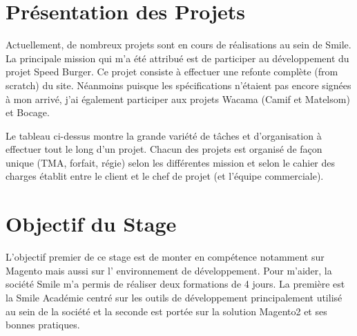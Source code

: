 \documentclass[12pt, a4paper, twoside]{report}
\begin{document}
\section{Présentation des Projets}

 Actuellement, de nombreux projets sont en cours de réalisations au sein de Smile. La principale mission qui m'a été attribué est de participer au développement du projet Speed Burger. Ce projet consiste à effectuer une refonte complète (from scratch) du site. Néanmoins puisque les spécifications n'étaient pas encore signées à mon arrivé, j'ai également participer aux projets Wacama (Camif et Matelsom) et Bocage. \\
 
 \begin{table}[H]
 	\centering
 \caption{ Tableau récapitulatif des objectifs principaux pour chaque projet auxquelles j'ai participé.}
 \end{table}

Le tableau ci-dessus montre la grande variété de tâches et d'organisation à effectuer tout le long d'un projet. Chacun des projets est organisé de façon unique (TMA, forfait, régie) selon les différentes mission et selon le cahier des charges établit entre le client et le chef de projet (et l'équipe commerciale). 


\section{Objectif du Stage}

L'objectif premier de ce stage est de monter en compétence notamment sur Magento mais aussi sur l' environnement de développement. Pour m'aider, la société Smile m'a permis de réaliser deux formations de 4 jours. La première est la Smile Académie centré sur les outils de développement principalement utilisé au sein de la société et la seconde est portée sur la solution Magento2 et ses bonnes pratiques. \\ 
\end{document}
